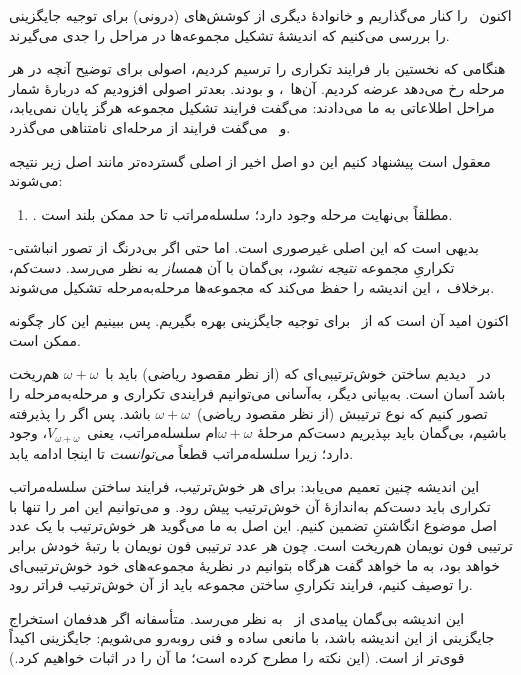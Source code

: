 \documentclass[../../../include/open-logic-section]{subfiles}
\begin{document}

اکنون~\limofsize{} را کنار می‌گذاریم و خانوادهٔ دیگری از کوشش‌های
(درونی) برای توجیه جایگزینی را بررسی می‌کنیم که اندیشهٔ تشکیل مجموعه‌ها
در مراحل را جدی می‌گیرند.

هنگامی که نخستین بار فرایند تکراری را ترسیم کردیم، اصولی برای توضیح آنچه
در هر مرحله رخ می‌دهد عرضه کردیم. آن‌ها~\stageshier، \stagesord و
\stagesacc بودند. بعدتر اصولی افزودیم که دربارهٔ شمار مراحل اطلاعاتی به
ما می‌دادند: \stagessucc{} می‌گفت فرایند تشکیل مجموعه هرگز پایان
نمی‌یابد، و~\stagesinf{} می‌گفت فرایند از مرحله‌ای نامتناهی می‌گذرد.

معقول است پیشنهاد کنیم این دو اصل اخیر از اصلی گسترده‌تر مانند اصل زیر
نتیجه می‌شوند:
\begin{enumerate}
	\item[] \stagesinex. مطلقاً بی‌نهایت مرحله وجود دارد؛ سلسله‌مراتب تا
	حد ممکن بلند است.
\end{enumerate}
بدیهی است که این اصلی غیرصوری است. اما حتی اگر بی‌درنگ از تصور
انباشتی-تکراریِ مجموعه \emph{نتیجه نشود}، بی‌گمان با آن \emph{همساز} به
نظر می‌رسد. دست‌کم، برخلاف~\limofsize، این اندیشه را حفظ می‌کند که
مجموعه‌ها مرحله‌به‌مرحله تشکیل می‌شوند.

اکنون امید آن است که از~\stagesinex{} برای توجیه جایگزینی بهره بگیریم.
پس ببینیم این کار چگونه ممکن است.

در~ دیدیم ساختن خوش‌ترتیبی‌ای که (از نظر
مقصود ریاضی) باید با~$\omega+\omega$ هم‌ریخت باشد آسان است. به‌بیانی
دیگر، به‌آسانی می‌توانیم فرایندی تکراری و مرحله‌به‌مرحله را تصور کنیم که
نوع ترتیبش (از نظر مقصود ریاضی)~$\omega+\omega$ باشد. پس اگر
\stagesinex{} را پذیرفته باشیم، بی‌گمان باید بپذیریم دست‌کم مرحلهٔ
$\omega+\omega$ام سلسله‌مراتب، یعنی~$V_{\omega+\omega}$، وجود دارد؛
زیرا سلسله‌مراتب قطعاً \emph{می‌توانست} تا اینجا ادامه یابد.

این اندیشه چنین تعمیم می‌یابد: برای هر خوش‌ترتیب، فرایند ساختن
سلسله‌مراتب تکراری باید دست‌کم به‌اندازهٔ آن خوش‌ترتیب پیش رود. و می‌توانیم
این امر را تنها با اصل موضوع انگاشتنِ
 تضمین کنیم. این اصل
به ما می‌گوید هر خوش‌ترتیب با یک عدد ترتیبی فون نویمان هم‌ریخت است. چون
هر عدد ترتیبی فون نویمان با رتبهٔ خودش برابر خواهد بود،
 به ما خواهد گفت
هرگاه بتوانیم در نظریهٔ مجموعه‌های خود خوش‌ترتیبی‌ای را توصیف کنیم،
فرایند تکراریِ ساختن مجموعه باید از آن خوش‌ترتیب فراتر رود.

این اندیشه بی‌گمان پیامدی از~\stagesinex{} به نظر می‌رسد. متأسفانه اگر
هدفمان استخراج جایگزینی از این اندیشه باشد، با مانعی ساده و فنی
روبه‌رو می‌شویم: جایگزینی اکیداً قوی‌تر از
 است. (این نکته را
\citet[\S13.2]{Potter2004} مطرح کرده است؛ ما آن را در
 اثبات خواهیم کرد.)
\end{document}
